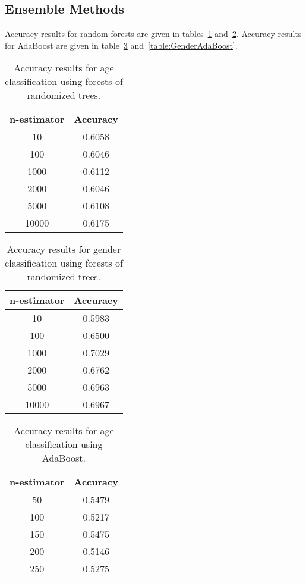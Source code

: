 \documentclass[a4paper]{llncs}
\begin{document}
\subsection{Ensemble Methods}
Accuracy results for random forests are given in tables~\ref{table:AgeRandomForests} and~\ref{table:GenderRandomForests}. Accuracy results for AdaBoost are given in table~\ref{table:AgeAdaBoost} and~\ref{table:GenderAdaBoost}.
\begin{table}[!htbp]
\centering
\begin{tabular}{|c|c|}
\hline
n-estimator & Accuracy \\ \hline
10          & 0.6058 \\ \hline
100         & 0.6046 \\ \hline
1000        & 0.6112 \\ \hline
2000        & 0.6046 \\ \hline
5000        & 0.6108 \\ \hline
10000       & 0.6175 \\ \hline
\end{tabular}
\caption{Accuracy results for age classification using forests of randomized trees.}
\label{table:AgeRandomForests}
\end{table}


\begin{table}[!htbp]
\centering
\begin{tabular}{|c|c|}
\hline
n-estimator & Accuracy \\ \hline
10          & 0.5983 \\ \hline
100         & 0.6500 \\ \hline
1000        & 0.7029 \\ \hline
2000        & 0.6762 \\ \hline
5000        & 0.6963 \\ \hline
10000       & 0.6967 \\ \hline
\end{tabular}
\caption{Accuracy results for gender classification using forests of randomized trees.}
\label{table:GenderRandomForests}
\end{table}

\begin{table}[!htbp]
\centering
\begin{tabular}{|c|c|}
\hline
n-estimator & Accuracy \\ \hline
50          & 0.5479 \\ \hline
100         & 0.5217 \\ \hline
150         & 0.5475 \\ \hline
200         & 0.5146 \\ \hline
250         & 0.5275 \\ \hline
\end{tabular}
\caption{Accuracy results for age classification using AdaBoost.}
\label{table:AgeAdaBoost}
\end{table}
\end{document}
